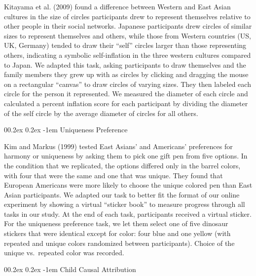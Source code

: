 \documentclass[
  man,floatsintext]{apa6}
\makeatletter
\let\oldparagraph\paragraph
\renewcommand{\paragraph}[1]{\oldparagraph{#1}\mbox{}}
\renewcommand{\paragraph}{\@startsection{paragraph}{4}{\parindent}%
  {0\baselineskip \@plus 0.2ex \@minus 0.2ex}%
  {-1em}%
  {\normalfont\normalsize\bfseries\itshape\typesectitle}}
\makeatother
\begin{document}
Kitayama et al. (2009) found a difference between Western and East Asian cultures in the size of circles participants drew to represent themselves relative to other people in their social networks. Japanese participants drew circles of similar sizes to represent themselves and others, while those from Western countries (US, UK, Germany) tended to draw their ``self'' circles larger than those representing others, indicating a symbolic self-inflation in the three western cultures compared to Japan. We adapted this task, asking participants to draw themselves and the family members they grew up with as circles by clicking and dragging the mouse on a rectangular ``canvas'' to draw circles of varying sizes. They then labeled each circle for the person it represented. We measured the diameter of each circle and calculated a percent inflation score for each participant by dividing the diameter of the self circle by the average diameter of circles for all others.

\hypertarget{uniqueness-preference}{%
\paragraph{Uniqueness Preference}\label{uniqueness-preference}}

Kim and Markus (1999) tested East Asians' and Americans' preferences for harmony or uniqueness by asking them to pick one gift pen from five options. In the condition that we replicated, the options differed only in the barrel colors, with four that were the same and one that was unique. They found that European Americans were more likely to choose the unique colored pen than East Asian participants. We adapted our task to better fit the format of our online experiment by showing a virtual ``sticker book'' to measure progress through all tasks in our study. At the end of each task, participants received a virtual sticker. For the uniqueness preference task, we let them select one of five dinosaur stickers that were identical except for color: four blue and one yellow (with repeated and unique colors randomized between participants). Choice of the unique vs.~repeated color was recorded.

\hypertarget{child-causal-attribution}{%
\paragraph{Child Causal Attribution}\label{child-causal-attribution}}
\end{document}
